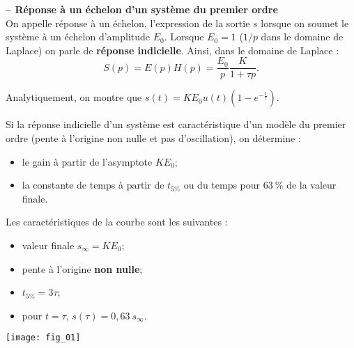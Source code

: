 \begin{resultat} \textbf{\textsf{\small -- Réponse à un échelon d'un système du premier ordre}} ~\\
On appelle réponse à un échelon, l'expression de la sortie $s$ lorsque on soumet le système à un échelon d'amplitude $E_0$. Lorsque $E_0=1$ ($1/p$ dans le domaine de Laplace) on parle de \textbf{réponse indicielle}.
Ainsi, dans le domaine de Laplace :
$$
S(p)=E(p)H(p) = \dfrac{E_0}{p} \dfrac{K}{1+\tau p}.
$$ 

Analytiquement, on montre que $s(t)=K E_0 u(t) \left(1-e^{-\frac{t}{\tau}}\right)$. 


\noindent \begin{minipage}[c]{.65\linewidth}

Si la réponse indicielle d'un système est caractéristique d'un modèle du premier ordre (pente à l'origine non nulle et pas d'oscillation), on détermine :
\begin{itemize}
\item le gain à partir de l'asymptote $K E_0$;
\item la constante de temps à partir de $t_{5\%}$ ou du temps pour $63~\%$ de la valeur finale.%
\end{itemize}
Les caractéristiques de la courbe sont les suivantes : 
\begin{itemize}
\item valeur finale $s_{\infty}=K E_0$;
\item pente à l'origine \textbf{non nulle};
\item $t_{5\%}=3\tau$;
\item pour $t=\tau$, $s(\tau)=0,63~ s_{\infty}$.
\end{itemize}
\end{minipage} \hfill
\begin{minipage}[c]{.32\linewidth}
\centering
\texttt{[image: fig\_01]}
\end{minipage}
\end{resultat}


